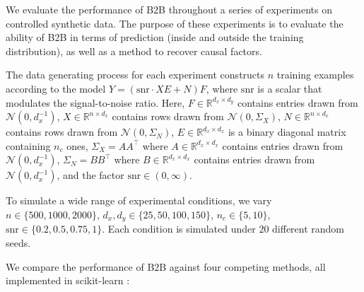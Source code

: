 We evaluate the performance of B2B throughout a series of experiments on
controlled synthetic data.
%
The purpose of these experiments is to evaluate the ability of B2B in terms of
prediction (inside and outside the training distribution), as well as a method
to recover causal factors.

The data generating process for each experiment constructs $n$ training examples
according to the model $Y = (\text{snr} \cdot XE + N)F$, where $\text{snr}$ is a
scalar that modulates the signal-to-noise ratio.
%
Here,
    $F \in \mathbb{R}^{d_x \times d_y}$ contains entries drawn from
$\mathcal{N}(0, d_x^{-1})$, $X \in \mathbb{R}^{n \times d_x}$ contains rows
drawn from $\mathcal{N}(0, \Sigma_X)$, $N \in \mathbb{R}^{n \times d_x}$
contains rows drawn from $\mathcal{N}(0, \Sigma_N)$, $E \in \mathbb{R}^{d_x
\times d_x}$ is a binary diagonal matrix containing $n_c$ ones, $\Sigma_X =
AA^\top$ where $A \in \mathbb{R}^{d_x \times d_x}$ contains entries drawn from
$\mathcal{N}(0, d_x^{-1})$, $\Sigma_N = BB^\top$ where $B \in \mathbb{R}^{d_x
\times d_x}$ contains entries drawn from $\mathcal{N}(0, d_x^{-1})$, and the
factor $\text{snr} \in (0, \infty)$.

To simulate a wide range of experimental conditions, we vary $n \in \{500, 1000,
2000\}$, $d_x, d_y \in \{ 25, 50, 100, 150 \}$, $n_c \in \{ 5, 10 \}$,
$\text{snr} \in \{ 0.2, 0.5, 0.75, 1 \}$.
%
Each condition is simulated under $20$ different random seeds.

We compare the performance of B2B against four competing methods, all
implemented in scikit-learn \citep{scikit}:
%

